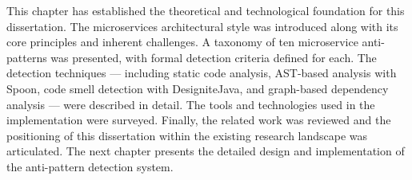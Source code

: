              \indent\par This chapter has established the theoretical and technological foundation for this dissertation. The microservices architectural style was introduced along with its core principles and inherent challenges. A taxonomy of ten microservice anti-patterns was presented, with formal detection criteria defined for each. The detection techniques --- including static code analysis, AST-based analysis with Spoon, code smell detection with DesigniteJava, and graph-based dependency analysis --- were described in detail. The tools and technologies used in the implementation were surveyed. Finally, the related work was reviewed and the positioning of this dissertation within the existing research landscape was articulated. The next chapter presents the detailed design and implementation of the anti-pattern detection system.
